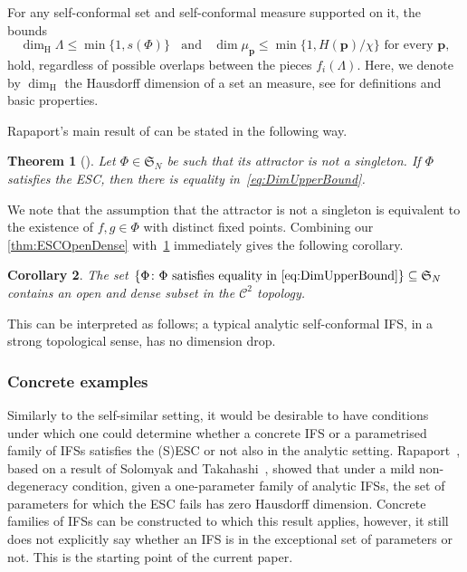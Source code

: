 \documentclass[12pt,]{article}
\def\cref#1{\ref{#1}}%
\newtheorem{theorem}{Theorem}[section]
\newtheorem{corollary}[theorem]{Corollary}
\theoremstyle{definition}
\theoremstyle{remark}
\newcommand{\0}{\mathbf{0}}
\begin{document}
{For any self-conformal set and self-conformal measure supported on it, the bounds
\begin{equation}\label{eq:DimUpperBound}
\dim_{\mathrm{H}} \Lambda \leq \min\{1,s(\Phi)\}  \;\;\text{ and }\;\; \dim \mu_{\mathbf{p}} \leq
\min\{1, H(\mathbf{p})/\chi\} \text{ for every } \mathbf{p},
\end{equation} 
hold, regardless of possible overlaps between the pieces $f_i(\Lambda)$.
Here, we denote by $\dim_{\mathrm H}$ the Hausdorff dimension of a set an measure, see
\cite{FalconerBook} for definitions and basic properties.

Rapaport's main result of \cite{Rapaport_SelfConfESC25arXiv}
can be stated in the following way.

\begin{theorem}[\cite{Rapaport_SelfConfESC25arXiv}]\label{thm:RapaportMain}
  Let $\Phi\in\mathfrak{S}_N$ be such that its attractor is not a singleton. If
  $\Phi$ satisfies the ESC, then there is equality in~\cref{eq:DimUpperBound}.
\end{theorem}
We note that the assumption that the attractor is not a singleton is equivalent to the existence of
$f,g\in\Phi$ with distinct fixed points.
Combining our \cref{thm:ESCOpenDense} with~\cref{thm:RapaportMain} immediately gives the following corollary.

\begin{corollary}
  The set $\{\Phi \colon \Phi \text{ satisfies equality in \cref{eq:DimUpperBound}}\}\subseteq
  \mathfrak{S}_N$ contains an open and dense subset in the $\mathcal{C}^2$ topology.
\end{corollary}
This can be interpreted as follows; a typical analytic self-conformal IFS, in a strong topological
sense, has no dimension drop.

\subsubsection{Concrete examples}\label{sec:examples}
Similarly to the self-similar setting, it would be desirable to have conditions under which one
could determine whether a concrete IFS or a parametrised family of IFSs satisfies the (S)ESC or not
also in the analytic setting. Rapaport~\cite[Corollary 1.4]{Rapaport_SelfConfESC25arXiv}, based on a
result of Solomyak and Takahashi~\cite{SolomyakTakahashi_IMRN21}, showed that under a mild
non-degeneracy condition, given a one-parameter family of analytic IFSs, the set of parameters for
which the ESC fails has zero Hausdorff dimension. Concrete families of IFSs can be constructed to
which this result applies, however, it still does not explicitly say whether an IFS is in the
exceptional set of parameters or not. This is the starting point of the current paper.


}
\end{document}
